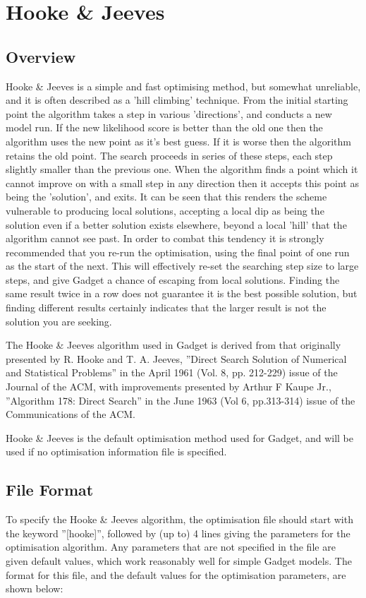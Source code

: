 \documentclass[10pt,twoside]{book}
\begin{document}
\section{Hooke \& Jeeves}\label{sec:hooke}
\subsection{Overview}\label{subsec:hookeover}
Hooke \& Jeeves is a simple and fast optimising method, but somewhat unreliable, and it is often described as a 'hill climbing' technique.  From the initial starting point the algorithm takes a step in various 'directions', and conducts a new model run.  If the new likelihood score is better than the old one then the algorithm uses the new point as it's best guess.  If it is worse then the algorithm retains the old point.  The search proceeds in series of these steps, each step slightly smaller than the previous one.  When the algorithm finds a point which it cannot improve on with a small step in any direction then it accepts this point as being the 'solution', and exits.  It can be seen that this renders the scheme vulnerable to producing local solutions, accepting a local dip as being the solution even if a better solution exists elsewhere, beyond a local 'hill' that the algorithm cannot see past.  In order to combat this tendency it is strongly recommended that you re-run the optimisation, using the final point of one run as the start of the next.  This will effectively re-set the searching step size to large steps, and give Gadget a chance of escaping from local solutions.  Finding the same result twice in a row does not guarantee it is the best possible solution, but finding different results certainly indicates that the larger result is not the solution you are seeking.

\bigskip
The Hooke \& Jeeves algorithm used in Gadget is derived from that originally presented by R. Hooke and T. A. Jeeves, ''Direct Search Solution of Numerical and Statistical Problems'' in the April 1961 (Vol. 8, pp. 212-229) issue of the Journal of the ACM, with improvements presented by Arthur F Kaupe Jr., ''Algorithm 178: Direct Search'' in the June 1963 (Vol 6, pp.313-314) issue of the Communications of the ACM.

\bigskip
Hooke \& Jeeves is the default optimisation method used for Gadget, and will be used if no optimisation information file is specified.

\subsection{File Format}\label{subsec:hookefile}
To specify the Hooke \& Jeeves algorithm, the optimisation file should start with the keyword ''[hooke]'', followed by (up to) 4 lines giving the parameters for the optimisation algorithm.  Any parameters that are not specified in the file are given default values, which work reasonably well for simple Gadget models.  The format for this file, and the default values for the optimisation parameters, are shown below:
\end{document}

